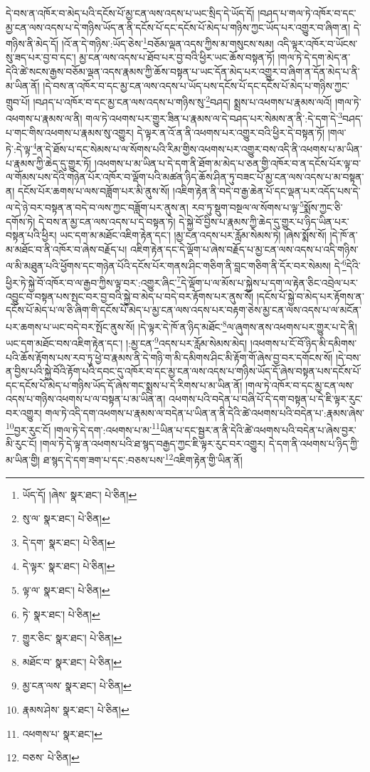 དེ་བས་ན་འཁོར་བ་མེད་པའི་དངོས་པོ་མྱ་ངན་ལས་འདས་པ་ཡང་སྲིད་དེ་ཡོད་དོ། །བཤད་པ་གལ་ཏེ་འཁོར་བ་དང་མྱ་ངན་ལས་འདས་པ་དེ་གཉིས་ཡོད་ན་ནི་དངོས་པོ་དང་དངོས་པོ་མེད་པ་གཉིས་ཀྱང་ཡོད་པར་འགྱུར་བ་ཞིག་ན། དེ་གཉིས་ནི་མེད་དོ། །འོ་ན་དེ་གཉིས་:ཡོད་ཅེས་\footnote{ཡོད་དོ། །ཞེས་  སྣར་ཐང་།  པེ་ཅིན། }བཅོམ་ལྡན་འདས་ཀྱིས་མ་གསུངས་སམ། འདི་ལྟར་འཁོར་བ་ཡོངས་སུ་ཟད་པར་བྱ་བ་དང་། མྱ་ངན་ལས་འདས་པ་ཐོབ་པར་བྱ་བའི་ཕྱིར་ཡང་ཆོས་བསྟན་ཏོ། །གལ་ཏེ་དེ་དག་མེད་ན་དེའི་ཚེ་སངས་རྒྱས་བཅོམ་ལྡན་འདས་རྣམས་ཀྱི་ཆོས་བསྟན་པ་ཡང་དོན་མེད་པར་འགྱུར་བ་ཞིག་ན་དོན་མེད་པ་ནི་མ་ཡིན་ནོ། །དེ་བས་ན་འཁོར་བ་དང་མྱ་ངན་ལས་འདས་པ་ཡོད་པས་དངོས་པོ་དང་དངོས་པོ་མེད་པ་གཉིས་ཀྱང་གྲུབ་པོ། །བཤད་པ་འཁོར་བ་དང་མྱ་ངན་ལས་འདས་པ་གཉིས་སུ་\footnote{སུ་ལ་  སྣར་ཐང་།  པེ་ཅིན། }བཤད། སྨྲས་པ་འཕགས་པ་རྣམས་ལའོ། །གལ་ཏེ་འཕགས་པ་རྣམས་ལ་ནི། གལ་ཏེ་འཕགས་པར་གྱུར་ཟིན་པ་རྣམས་ལ་དེ་བཤད་པར་སེམས་ན་ནི་:དེ་དག་དེ་\footnote{དེ་དག་  སྣར་ཐང་།  པེ་ཅིན། }བཤད་པ་གང་གིས་འཕགས་པ་རྣམས་སུ་འགྱུར། དེ་ལྟར་ན་འོ་ན་ནི་འཕགས་པར་འགྱུར་བའི་ཕྱིར་དེ་བསྟན་ཏོ། །གལ་ཏེ་:དེ་ལྟ་\footnote{དེ་ལྟར་  སྣར་ཐང་།  པེ་ཅིན། }ན་དེ་ཐོས་པ་དང་སེམས་པ་ལ་སོགས་པའི་རིམ་གྱིས་འཕགས་པར་འགྱུར་བས་འདི་ནི་འཕགས་པ་མ་ཡིན་པ་རྣམས་ཀྱི་ཆེད་དུ་གྱུར་ཏོ། །འཕགས་པ་མ་ཡིན་པ་དེ་དག་ནི་ཐོག་མ་མེད་པ་ཅན་གྱི་འཁོར་བ་ན་དངོས་པོར་ལྟ་བ་ལ་གོམས་པས་དེའི་གཉེན་པོར་འཁོར་བ་ལྡོག་པའི་མཚན་ཉིད་ཆོས་ཤིན་ཏུ་བཟང་པོ་མྱ་ངན་ལས་འདས་པ་མ་བསྟན་ན། དངོས་པོར་ཆགས་པ་ལས་བཟློག་པར་མི་ནུས་སོ། །འཇིག་རྟེན་ནི་བདེ་བ་རྒྱ་ཆེན་པོ་དང་ལྡན་པར་འདོད་པས་དེ་ལ་དེ་ཉེ་བར་བསྟན་ན་བདེ་བ་ལས་ཀྱང་བཟློག་པར་ནུས་ན། རབ་ཏུ་སྡུག་བསྔལ་ལ་སོགས་པ་ལྟ་\footnote{ལྟ་ལ་  སྣར་ཐང་།  པེ་ཅིན། }སྨོས་ཀྱང་ཅི་དགོས་ཏེ། དེ་བས་ན་མྱ་ངན་ལས་འདས་པ་དེ་བསྟན་ཏེ། དེ་སྐྱེ་བོ་བྱིས་པ་རྣམས་ཀྱི་ཆེད་དུ་གྱུར་པ་ཉིད་ཡིན་པར་བསྟན་པའི་ཕྱིར། ཡང་དག་མ་མཐོང་འཇིག་རྟེན་དང་། །མྱ་ངན་འདས་པར་རློམ་སེམས་ཏེ། །ཞེས་སྨོས་སོ། །དེ་ཁོ་ན་མ་མཐོང་བ་ནི་འཁོར་བ་ཞེས་བརྗོད་པ། འཇིག་རྟེན་དང་དེ་ལྡོག་པ་ཞེས་བརྗོད་པ་མྱ་ངན་ལས་འདས་པ་འདི་གཉིས་ལ་མི་མཐུན་པའི་ཕྱོགས་དང་གཉེན་པོའི་དངོས་པོར་གནས་ཤིང་གཅིག་ནི་བླང་གཅིག་ནི་དོར་བར་སེམས། དེ་\footnote{ཏེ་  སྣར་ཐང་།  པེ་ཅིན། }དེའི་ཕྱིར་ཏེ་སྐྱེ་བོ་འཁོར་བ་ལ་རྒྱབ་ཀྱིས་ལྟ་བར་:འགྱུར་ཞིང་\footnote{གྱུར་ཅིང་  སྣར་ཐང་།  པེ་ཅིན། }དེ་ལྡོག་པ་ལ་མོས་པ་སྐྱེས་པ་དག་ལ་རྟེན་ཅིང་འབྲེལ་པར་འབྱུང་བ་བསྟན་པས་སྤང་བར་བྱ་བའི་སྐྱེ་བ་མེད་པ་བདེ་བར་རྟོགས་པར་ནུས་སོ། །དངོས་པོ་སྐྱེ་བ་མེད་པར་རྟོགས་ན་དངོས་པོ་མེད་པ་ལ་ཅི་ཞིག་གི་དངོས་པོ་མེད་པ་མྱ་ངན་ལས་འདས་པར་བརྟག་ཅེས་མྱ་ངན་ལས་འདས་པ་ལ་མངོན་པར་ཆགས་པ་ཡང་བདེ་བར་སྤོང་ནུས་སོ། །དེ་ལྟར་དེ་ཁོ་ན་ཉིད་མཐོང་\footnote{མཐོང་བ་  སྣར་ཐང་།  པེ་ཅིན། }ལ་ཞུགས་ནས་འཕགས་པར་གྱུར་པ་དེ་ནི། ཡང་དག་མཐོང་བས་འཇིག་རྟེན་དང་། །:མྱ་ངན་\footnote{མྱ་ངན་ལས་  སྣར་ཐང་།  པེ་ཅིན། }འདས་པར་རློམ་སེམས་མེད། །འཕགས་པ་ངོ་བོ་ཉིད་མི་དམིགས་པའི་ཆོས་རྟོགས་པས་རབ་ཏུ་ཕྱེ་བ་རྣམས་ནི་དེ་གཉི་ག་མི་དམིགས་ཤིང་མི་རྟོག་གོ་ཞེས་བྱ་བར་དགོངས་སོ། །དེ་བས་ན་བྱིས་པའི་སྐྱེ་བོའི་རྟོག་པའི་དབང་དུ་འཁོར་བ་དང་མྱ་ངན་ལས་འདས་པ་གཉིས་ཡོད་དོ་ཞེས་བསྟན་པས་དངོས་པོ་དང་དངོས་པོ་མེད་པ་གཉིས་ཡོད་དོ་ཞེས་གང་སྨྲས་པ་དེ་རིགས་པ་མ་ཡིན་ནོ། །གལ་ཏེ་འཁོར་བ་དང་མྱ་ངན་ལས་འདས་པ་གཉིས་འཕགས་པ་ལ་བསྟན་པ་མ་ཡིན་ན། འཕགས་པའི་བདེན་པ་བཞི་པོ་དེ་དག་བསྟན་པ་དེ་ཇི་ལྟར་རུང་བར་འགྱུར། གལ་ཏེ་འདི་དག་འཕགས་པ་རྣམས་ལ་བདེན་པ་ཡིན་ན་ནི་དེའི་ཚེ་འཕགས་པའི་བདེན་པ་:རྣམས་ཞེས་\footnote{རྣམས་ཤེས་  སྣར་ཐང་།  པེ་ཅིན། }བྱར་རུང་ངོ། །གལ་ཏེ་དེ་དག་:འཕགས་པ་མ་\footnote{འཕགས་པ་  སྣར་ཐང་། }ཡིན་པ་དང་སྦྱར་ན་ནི་དེའི་ཚེ་འཕགས་པའི་བདེན་པ་ཞེས་བྱར་མི་རུང་ངོ། །གལ་ཏེ་དེ་ལྟ་ན་འཕགས་པའི་ཐ་སྙད་བརྒྱད་ཀྱང་ཇི་ལྟར་རུང་བར་འགྱུར། དེ་དག་ནི་འཕགས་པ་ཉིད་ཀྱི་མ་ཡིན་གྱི། ཐ་སྙད་དེ་དག་ཟག་པ་དང་:བཅས་པས་\footnote{བཅས་  པེ་ཅིན། }འཇིག་རྟེན་གྱི་ཡིན་ནོ། 